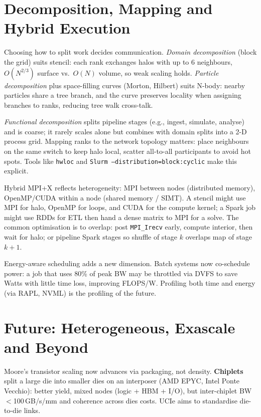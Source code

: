 \section{Decomposition, Mapping and Hybrid Execution}\label{sec:decomp}
Choosing how to split work decides communication. \emph{Domain decomposition} (block the grid) suits stencil: each rank exchanges halos with up to 6 neighbours, $O(N^{2/3})$ surface vs.\ $O(N)$ volume, so weak scaling holds. \emph{Particle decomposition} plus space-filling curves (Morton, Hilbert) suits N-body: nearby particles share a tree branch, and the curve preserves locality when assigning branches to ranks, reducing tree walk cross-talk.

\emph{Functional decomposition} splits pipeline stages (e.g., ingest, simulate, analyse) and is coarse; it rarely scales alone but combines with domain splits into a 2-D process grid. Mapping ranks to the network topology matters: place neighbours on the same switch to keep halo local, scatter all-to-all participants to avoid hot spots. Tools like \texttt{hwloc} and \texttt{Slurm --distribution=block:cyclic} make this explicit.

Hybrid MPI+X reflects heterogeneity: MPI between nodes (distributed memory), OpenMP/CUDA within a node (shared memory / SIMT). A stencil might use MPI for halo, OpenMP for loops, and CUDA for the compute kernel; a Spark job might use RDDs for ETL then hand a dense matrix to MPI for a solve. The common optimisation is to overlap: post \texttt{MPI\_Irecv} early, compute interior, then wait for halo; or pipeline Spark stages so shuffle of stage $k$ overlaps map of stage $k+1$.

Energy-aware scheduling adds a new dimension. Batch systems now co-schedule power: a job that uses 80\% of peak BW may be throttled via DVFS to save Watts with little time loss, improving FLOPS/W. Profiling both time and energy (via RAPL, NVML) is the profiling of the future.

\section{Future: Heterogeneous, Exascale and Beyond}\label{sec:future}
Moore's transistor scaling now advances via packaging, not density. \textbf{Chiplets} split a large die into smaller dies on an interposer (AMD EPYC, Intel Ponte Vecchio): better yield, mixed nodes (logic + HBM + I/O), but inter-chiplet BW $<$100\,GB/s/mm and coherence across dies costs. UCIe aims to standardise die-to-die links.

